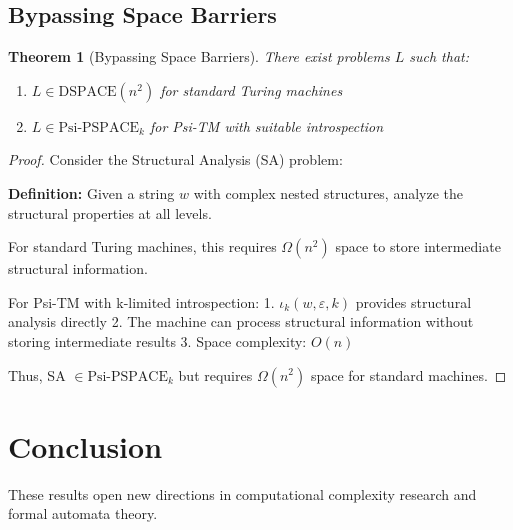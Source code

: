 \documentclass[11pt]{article}
\newtheorem{theorem}{Theorem}
\begin{document}
\subsection{Bypassing Space Barriers}

\begin{theorem}[Bypassing Space Barriers]
There exist problems $L$ such that:
\begin{enumerate}
\item $L \in \text{DSPACE}(n^2)$ for standard Turing machines
\item $L \in \text{Psi-PSPACE}_k$ for Psi-TM with suitable introspection
\end{enumerate}
\end{theorem}

\begin{proof}
Consider the Structural Analysis (SA) problem:

\textbf{Definition:} Given a string $w$ with complex nested structures, analyze the structural properties at all levels.

For standard Turing machines, this requires $\Omega(n^2)$ space to store intermediate structural information.

For Psi-TM with k-limited introspection:
1. $\iota_k(w, \varepsilon, k)$ provides structural analysis directly
2. The machine can process structural information without storing intermediate results
3. Space complexity: $O(n)$

Thus, SA $\in \text{Psi-PSPACE}_k$ but requires $\Omega(n^2)$ space for standard machines.
\end{proof}

\section{Conclusion}

These results open new directions in computational complexity research and formal automata theory.
\end{document}

